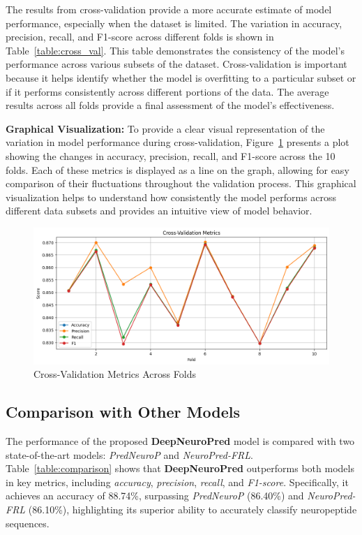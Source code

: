 \documentclass[conference]{IEEEtran}
\begin{document}
The results from cross-validation provide a more accurate estimate of model performance, especially when the dataset is limited. The variation in accuracy, precision, recall, and F1-score across different folds is shown in Table~\ref{table:cross_val}. This table demonstrates the consistency of the model's performance across various subsets of the dataset. Cross-validation is important because it helps identify whether the model is overfitting to a particular subset or if it performs consistently across different portions of the data. The average results across all folds provide a final assessment of the model’s effectiveness.

\textbf{Graphical Visualization:}  
To provide a clear visual representation of the variation in model performance during cross-validation, Figure~\ref{fig:cross_validation} presents a plot showing the changes in accuracy, precision, recall, and F1-score across the 10 folds. Each of these metrics is displayed as a line on the graph, allowing for easy comparison of their fluctuations throughout the validation process. This graphical visualization helps to understand how consistently the model performs across different data subsets and provides an intuitive view of model behavior.

\begin{figure}[h]
\centering
\includegraphics[width=1\linewidth]{Images/9.png}
\caption{Cross-Validation Metrics Across Folds}
\label{fig:cross_validation}
\end{figure}

\subsection{Comparison with Other Models}

The performance of the proposed \textbf{DeepNeuroPred} model is compared with two state-of-the-art models: \textit{PredNeuroP} and \textit{NeuroPred-FRL}. Table~\ref{table:comparison} shows that \textbf{DeepNeuroPred} outperforms both models in key metrics, including \textit{accuracy}, \textit{precision}, \textit{recall}, and \textit{F1-score}. Specifically, it achieves an accuracy of 88.74\%, surpassing \textit{PredNeuroP} (86.40\%) and \textit{NeuroPred-FRL} (86.10\%), highlighting its superior ability to accurately classify neuropeptide sequences.
\end{document}
